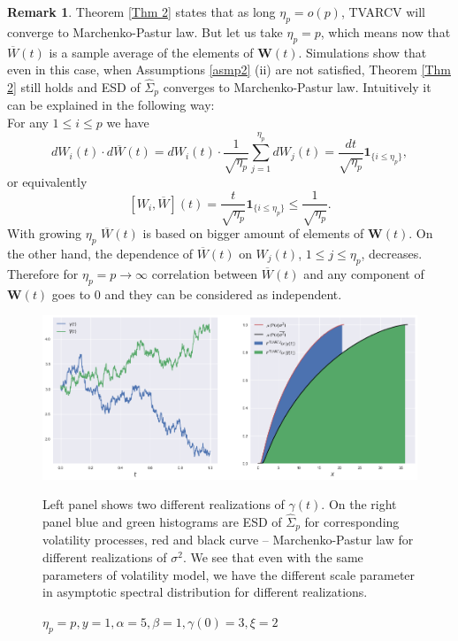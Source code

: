 \documentclass[a4paper,11pt]{book}
\theoremstyle{plain}
\theoremstyle{definition}
\newtheorem{rmrk}[thm]{Remark}
\begin{document}
    \begin{rmrk}
    	Theorem \ref{Thm 2} states that as long $\eta_p = o(p)$, TVARCV will converge to Marchenko-Pastur law. But let us take $\eta_p = p$, which means now that $\overline{W}(t)$ is a sample average of the elements of $\mathbf{W}(t)$. Simulations show that even in this case, when Assumptions \ref{asmp2} (ii) are not satisfied, Theorem \ref{Thm 2} still holds and ESD of $\widehat{\Sigma}_p$ converges to Marchenko-Pastur law. Intuitively it can be explained in the following way: \\
    	For any $1 \leq i \leq p$ we have
    	\[ dW_i(t) \cdot d\overline{W}(t) = dW_i(t) \cdot \frac{1}{\sqrt{\eta_p}} \sum_{j=1}^{\eta_p}dW_j(t) = \frac{dt}{\sqrt{\eta_p}} \mathbf{1}_{\{i \leq \eta_p\}}, \]
    	or equivalently 
    	\[ [W_i, \overline{W}](t) =  \frac{t}{\sqrt{\eta_p}} \mathbf{1}_{\{i \leq \eta_p\}} \leq \frac{1}{\sqrt{\eta_p}} .  \]
    	With growing $\eta_p$ $\overline{W}(t)$ is based on bigger amount of elements of $\mathbf{W}(t)$. On the other hand, the dependence of $\overline{W}(t)$ on $W_j(t)$, $1 \leq j \leq \eta_p$, decreases. Therefore for $\eta_p = p \rightarrow \infty$ correlation between $\overline{W}(t)$ and any component of $\mathbf{W}(t)$ goes to $0$ and they can be considered as independent.
    \end{rmrk}
    
    \begin{figure}[ht]
    	\begin{center} \centering
    		\includegraphics[scale=0.4]{XCIR}
    		\caption{$\eta_p = p, y = 1, \alpha = 5, \beta = 1, \gamma(0) = 3, \xi = 2$}
    		\smallskip
    		\small
    		Left panel shows two different realizations of $\gamma(t)$. On the right panel blue and green histograms are ESD of $\widehat{\Sigma}_p$ for corresponding volatility processes, red and black curve -- Marchenko-Pastur law for different realizations of $\sigma^2$. We see that even with the same parameters of volatility model, we have the different scale parameter in asymptotic spectral distribution for different realizations.
    	\end{center}
    \end{figure}
    		
\end{document}
